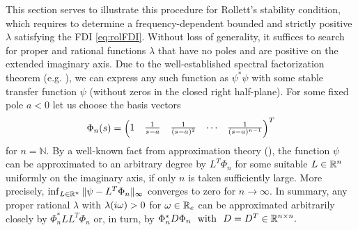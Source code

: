 This section serves to illustrate this procedure for Rollett's stability condition, 
which requires to determine a frequency-dependent bounded and strictly positive 
$\lambda$ satisfying the FDI \eqref{eq:rolFDI}. Without loss of generality, it 
suffices to search for proper and rational functions $\lambda$ that have no poles 
and are positive on the extended imaginary axis. Due to the well-established spectral 
factorization theorem (e.g. \cite{francis}), we can express any such function as 
$\psi^*\psi$ with some stable transfer function $\psi$ (without zeros in the closed 
right half-plane). For some fixed pole $a<0$ let us choose the basis vectors
\begin{equation*}
\Phi_n(s) = \begin{pmatrix}1 &\frac{1}{s-a} &\frac{1}{(s-a)^2} &\cdots &\frac{1}{(s-a)^{n-1}}\end{pmatrix}^T
\end{equation*}
for $n=\mathbb{N}$. By a well-known fact from approximation theory (\cite{pinkus}), 
the function $\psi$ can be approximated to an arbitrary degree by $L^T\Phi_n$ for some 
suitable $L\in\mathbb{R}^n$ uniformly on the imaginary axis, if only $n$ is taken sufficiently 
large. More precisely, $\inf_{L\in\mathbb{R}^n}\|\psi-L^T\Phi_n\|_\infty$ converges to zero for 
$n\to\infty$. In summary, any proper rational $\lambda$ with $\lambda(i\omega)>0$ for 
$\omega\in\mathbb{R}_e$ can be approximated arbitrarily closely by $\Phi_n^*LL^T\Phi_n$ or, 
in turn, by $\Phi_n^*D\Phi_n\text{\ \ with\ \ }D=D^T\in\mathbb{R}^{n\times n}.$


